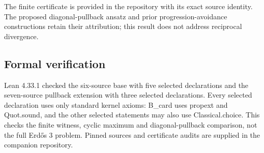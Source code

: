 \documentclass[11pt,a4paper]{article}
\begin{document}
The finite certificate is provided in the repository with its exact source identity. The proposed diagonal-pullback ansatz and prior progression-avoidance constructions retain their attribution; this result does not address reciprocal divergence.

\subsection{Formal verification}
Lean 4.33.1 checked the six-source base with five selected declarations and the seven-source pullback extension with three selected declarations. Every selected declaration uses only standard kernel axioms: B\_card uses propext and Quot.sound, and the other selected statements may also use Classical.choice. This checks the finite witness, cyclic maximum and diagonal-pullback comparison, not the full Erdős 3 problem. Pinned sources and certificate audits are supplied in the companion repository.
\end{document}
